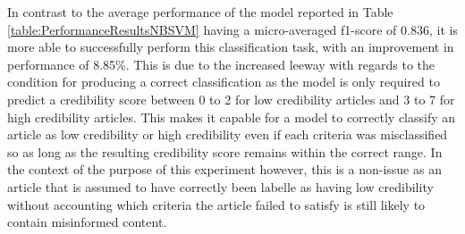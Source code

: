 \documentclass[a4paper,twoside,phd]{BYUPhys}
\begin{document}
In contrast to the average performance of the model reported in Table \ref{table:PerformanceResultsNBSVM} having a micro-averaged f1-score of 0.836, it is more able to successfully perform this classification task, with an improvement in performance of 8.85\%. This is due to the increased leeway with regards to the condition for producing a correct classification as the model is only required to predict a credibility score between 0 to 2 for low credibility articles and 3 to 7 for high credibility articles. This makes it capable for a model to correctly classify an article as low credibility or high credibility even if each criteria was misclassified so as long as the resulting credibility score remains within the correct range. In the context of the purpose of this experiment however, this is a non-issue as an article that is assumed to have correctly been labelle as having low credibility without accounting which criteria the article failed to satisfy is still likely to contain misinformed content.

\begin{table}[H]
	\centering
	\caption{Performance of low credibility identification task via an ensemble approach.}

	\label{table:SingleModelApproach}
\end{table}
\end{document}
